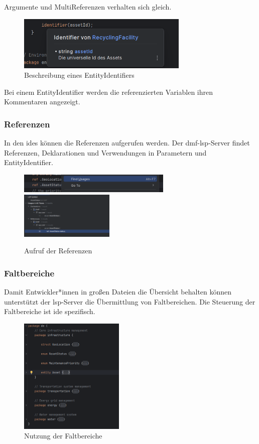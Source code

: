 \documentclass[./einleitung.tex]{subfiles}
\begin{document}
    Argumente und MultiReferenzen verhalten sich gleich.
    \begin{figure}[H]
        \centering
        \includegraphics[height=7em]{bilder/hover-entity-identifier}
        \caption{Beschreibung eines EntityIdentifiers}
        \label{fig:hover-entity-identifier}
    \end{figure}
    Bei einem EntityIdentifier werden die referenzierten Variablen ihren Kommentaren angezeigt.

    \subsubsection{Referenzen}\label{subsubsec:useReferenzen}
    In den \acrshort{ide}s können die Referenzen aufgerufen werden.
    Der \acrshort{dmf}-\acrshort{lsp}-Server findet Referenzen, Deklarationen und Verwendungen in Parametern und EntityIdentifier.
    \begin{figure}[H]
        \centering
        \includegraphics[height=2.5em]{bilder/callReferencen}
        \includegraphics[height=6em]{bilder/referencen}
        \caption{Aufruf der Referenzen}
        \label{fig:callreferencen}
    \end{figure}

    \subsubsection{Faltbereiche}\label{subsubsec:useFaltbereiche}
    Damit Entwickler*innen in großen Dateien die Übersicht behalten können unterstützt der \acrshort{lsp}-Server die Übermittlung von Faltbereichen.
    Die Steuerung der Faltbereiche ist \acrshort{ide} spezifisch.
    \begin{figure}[H]
        \centering
        \includegraphics[height=15em]{bilder/faltbereich}
        \caption{Nutzung der Faltbereiche}
        \label{fig:faltbereich}
    \end{figure}
\end{document}
